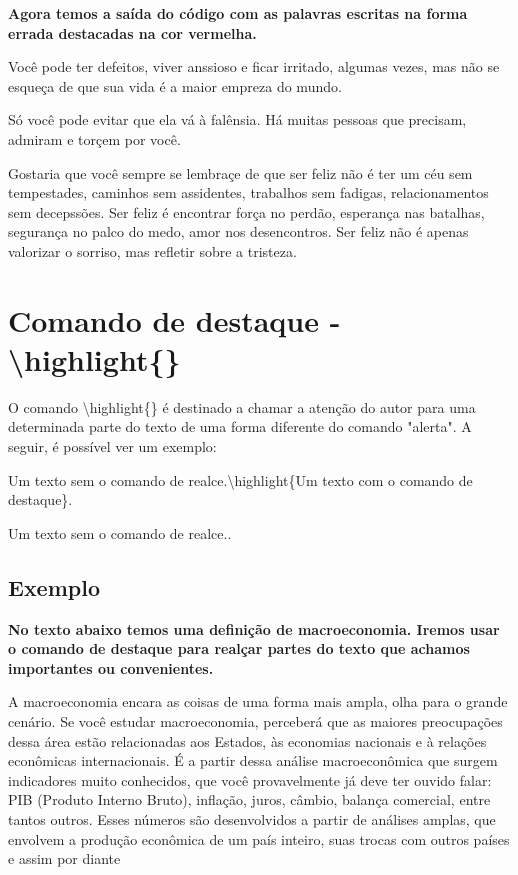 \documentclass[12pt,openright,oneside,a4paper,sumario=tradicional,brazil]{abntex2}
\begin{document}
\textbf{Agora temos a saída do código com as palavras escritas na forma errada destacadas na cor vermelha.}

\begin{center}
\justifying
Você pode ter defeitos, viver \alert{anssioso} e ficar irritado, algumas vezes, mas não se esqueça de que sua vida é a maior \alert{empreza} do mundo.

Só você pode evitar que ela vá à \alert{fal{\^e}nsia}. Há muitas pessoas que precisam, admiram e \alert{tor{\c c}em} por você.

Gostaria que você sempre se \alert{lembra{\c c}e} de que ser feliz não é ter um céu sem tempestades, caminhos sem \alert{assidentes}, trabalhos sem fadigas, relacionamentos sem \alert{decepss{\~o}es}. Ser feliz é encontrar força no perdão, esperança nas batalhas, segurança no palco do medo, amor nos desencontros. Ser feliz não é apenas valorizar o sorriso, mas refletir sobre a tristeza.
\end{center}


\section{Comando de destaque - \textbackslash highlight\{\}}
O comando \textbackslash highlight\{\} é destinado a chamar a atenção do autor para uma determinada parte do texto de uma forma diferente do comando "alerta". A seguir, é possível ver um exemplo:\\

\begin{minipage}{0.45\textwidth}
Um texto sem o comando de realce.\textbackslash highlight\{Um texto com o comando de destaque\}.
\end{minipage}\hfill
\begin{minipage}{0.45\textwidth}
Um texto sem o comando de realce..
\end{minipage}

\subsection{Exemplo}

\textbf{No texto abaixo temos uma definição de macroeconomia. Iremos usar o comando de destaque para realçar partes do texto que achamos importantes ou convenientes.}

\begin{center}
    \justifying
 A macroeconomia encara as coisas de uma forma mais ampla, olha para o grande cenário. Se você estudar macroeconomia, perceberá que as maiores preocupações dessa área estão relacionadas aos Estados, às economias nacionais e à relações econômicas internacionais. É a partir dessa análise macroeconômica que surgem indicadores muito conhecidos, que você provavelmente já deve ter ouvido falar: PIB (Produto Interno Bruto), inflação, juros, câmbio, balança comercial, entre tantos outros. Esses números são desenvolvidos a partir de análises amplas, que envolvem a produção econômica de um país inteiro, suas trocas com outros países e assim por diante   
    
\end{center}
\end{document}
